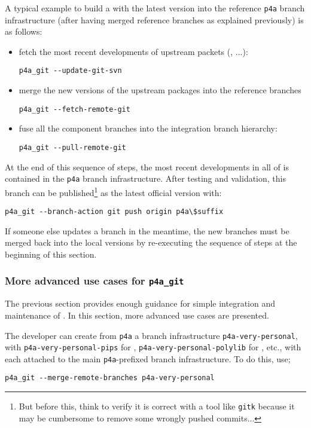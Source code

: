 \documentclass[a4paper]{article}
\begin{document}
A typical example to build a \Apfa with the latest \Apips version into the
reference \verb|p4a| branch infrastructure (after having merged
reference branches as explained previously) is as follows:
\begin{itemize}
\item fetch the most recent developments of upstream packets (\Apips,
  \Apolylib...):
\begin{verbatim}
p4a_git --update-git-svn
\end{verbatim}
\item merge the new versions of the upstream packages into the \Apfa
  reference branches
\begin{verbatim}
p4a_git --fetch-remote-git
\end{verbatim}
\item fuse all the component branches into the \Apfa integration
  branch hierarchy:
\begin{verbatim}
p4a_git --pull-remote-git
\end{verbatim}
\end{itemize}
At the end of this sequence of steps, the most recent developments in all
of \Apfa is contained in the \verb|p4a| branch infrastructure.  After
testing and validation, this branch can be published\footnote{But before
  this, think to verify it is correct with a tool like \texttt{gitk}
  because it may be cumbersome to remove some wrongly pushed commits...}
as the latest official version with:
\begin{verbatim}
p4a_git --branch-action git push origin p4a\$suffix
\end{verbatim}
If someone else updates a branch in the meantime, the new branches
must be merged back into the local versions by re-executing the sequence
of steps at the beginning of this section.

\subsubsection{More advanced use cases for \protect\texttt{p4a\_git}}
\label{sec:more-advanced-use}

The previous section provides enough guidance for simple integration
and maintenance of \Apfa. In this section, more advanced use cases are
presented.

The developer can create from \texttt{p4a} a branch infrastructure
\verb|p4a-very-personal|, with \verb|p4a-very-personal-pips| for
\Apips, \verb|p4a-very-personal-polylib| for \Apolylib, etc.,
with each attached to the main \verb|p4a|-prefixed branch
infrastructure. To do this, use;
\begin{verbatim}
p4a_git --merge-remote-branches p4a-very-personal
\end{verbatim}
\end{document}
